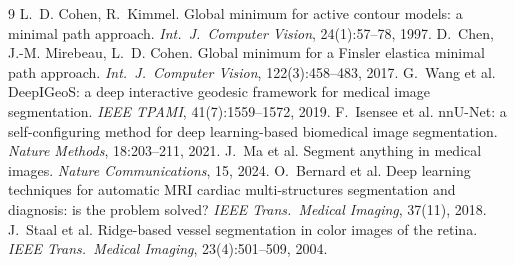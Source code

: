 \documentclass[11pt,a4paper]{article}
\begin{document}
\small
\begin{thebibliography}{9}
\setlength{\itemsep}{0pt}
 L.~D. Cohen, R.~Kimmel. Global minimum for active contour models: a minimal path
  approach. \emph{Int.\ J.\ Computer Vision}, 24(1):57--78, 1997.
 D.~Chen, J.-M. Mirebeau, L.~D. Cohen. Global minimum for a Finsler elastica minimal path
  approach. \emph{Int.\ J.\ Computer Vision}, 122(3):458--483, 2017.
 G.~Wang et al. DeepIGeoS: a deep interactive geodesic framework for medical image
  segmentation. \emph{IEEE TPAMI}, 41(7):1559--1572, 2019.
 F.~Isensee et al. nnU-Net: a self-configuring method for deep learning-based biomedical
  image segmentation. \emph{Nature Methods}, 18:203--211, 2021.
 J.~Ma et al. Segment anything in medical images. \emph{Nature Communications}, 15, 2024.
 O.~Bernard et al. Deep learning techniques for automatic MRI cardiac multi-structures
  segmentation and diagnosis: is the problem solved? \emph{IEEE Trans.\ Medical Imaging}, 37(11), 2018.
 J.~Staal et al. Ridge-based vessel segmentation in color images of the retina.
  \emph{IEEE Trans.\ Medical Imaging}, 23(4):501--509, 2004.
\end{thebibliography}
\normalsize

\end{document}
